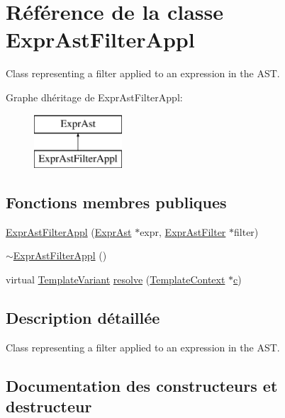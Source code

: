 \hypertarget{class_expr_ast_filter_appl}{}\section{Référence de la classe Expr\+Ast\+Filter\+Appl}
\label{class_expr_ast_filter_appl}


Class representing a filter applied to an expression in the A\+S\+T.  


Graphe d\textquotesingle{}héritage de Expr\+Ast\+Filter\+Appl\+:\begin{figure}[H]
\begin{center}
\leavevmode
\includegraphics[height=2.000000cm]{class_expr_ast_filter_appl}
\end{center}
\end{figure}
\subsection*{Fonctions membres publiques}
\begin{DoxyCompactItemize}
\item 
\hyperlink{class_expr_ast_filter_appl_a7f851ad2d258a878727019f8e6d86532}{Expr\+Ast\+Filter\+Appl} (\hyperlink{class_expr_ast}{Expr\+Ast} $\ast$expr, \hyperlink{class_expr_ast_filter}{Expr\+Ast\+Filter} $\ast$filter)
\item 
\hyperlink{class_expr_ast_filter_appl_a2b8608ca273ac2b3945fb04d77ec38d1}{$\sim$\+Expr\+Ast\+Filter\+Appl} ()
\item 
virtual \hyperlink{class_template_variant}{Template\+Variant} \hyperlink{class_expr_ast_filter_appl_aadbd0425767b093f0d37f6abf031ed69}{resolve} (\hyperlink{class_template_context}{Template\+Context} $\ast$\hyperlink{060__command__switch_8tcl_ab14f56bc3bd7680490ece4ad7815465f}{c})
\end{DoxyCompactItemize}


\subsection{Description détaillée}
Class representing a filter applied to an expression in the A\+S\+T. 

\subsection{Documentation des constructeurs et destructeur}
\hypertarget{class_expr_ast_filter_appl_a7f851ad2d258a878727019f8e6d86532}{}
